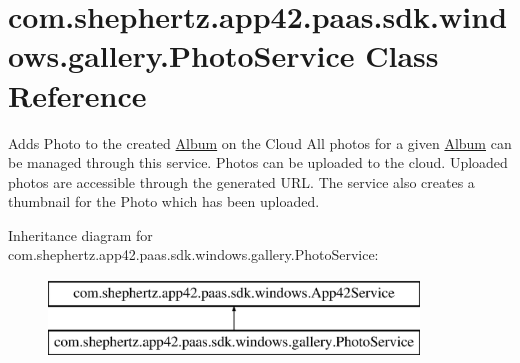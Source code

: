 \hypertarget{classcom_1_1shephertz_1_1app42_1_1paas_1_1sdk_1_1windows_1_1gallery_1_1_photo_service}{\section{com.\+shephertz.\+app42.\+paas.\+sdk.\+windows.\+gallery.\+Photo\+Service Class Reference}
\label{classcom_1_1shephertz_1_1app42_1_1paas_1_1sdk_1_1windows_1_1gallery_1_1_photo_service}
}


Adds Photo to the created \hyperlink{classcom_1_1shephertz_1_1app42_1_1paas_1_1sdk_1_1windows_1_1gallery_1_1_album}{Album} on the Cloud All photos for a given \hyperlink{classcom_1_1shephertz_1_1app42_1_1paas_1_1sdk_1_1windows_1_1gallery_1_1_album}{Album} can be managed through this service. Photos can be uploaded to the cloud. Uploaded photos are accessible through the generated U\+R\+L. The service also creates a thumbnail for the Photo which has been uploaded.  


Inheritance diagram for com.\+shephertz.\+app42.\+paas.\+sdk.\+windows.\+gallery.\+Photo\+Service\+:\begin{figure}[H]
\begin{center}
\leavevmode
\includegraphics[height=2.000000cm]{classcom_1_1shephertz_1_1app42_1_1paas_1_1sdk_1_1windows_1_1gallery_1_1_photo_service}
\end{center}
\end{figure}
